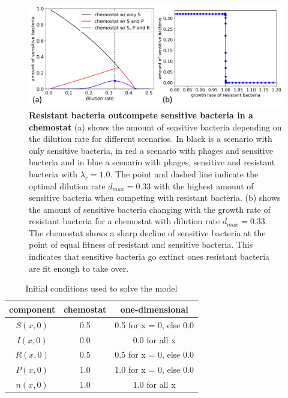 \begin{figure}
\centering
\includegraphics[width=\linewidth]{graphics/2025_09_30_phages_fig3.png}
\caption{\textbf{Resistant bacteria outcompete sensitive bacteria in a chemostat} (a) shows the amount of sensitive bacteria depending on the dilution rate for different scenarios. In black is a scenario with only sensitive bacteria, in red a scenario with phages and sensitive bacteria and in blue a scenario with phages, sensitive and resistant bacteria with $\lambda_r=1.0$. The point and dashed line indicate the optimal dilution rate $d_{max} = 0.33$ with the highest amount of sensitive bacteria when competing with resistant bacteria. (b) shows the amount of sensitive bacteria changing with the growth rate of resistant bacteria for a chemostat with dilution rate $d_{max} = 0.33$. The chemostat shows a sharp decline of sensitive bacteria at the point of equal fitness of resistant and sensitive bacteria. This indicates that sensitive bacteria go extinct ones resistant bacteria are fit enough to take over.}
\label{fig:results_chemostat_traveling_wave}
\end{figure}

\begin{table}
    \centering
    \begin{tabular}{c|c|c}
         component & chemostat & one-dimensional \\ \hline
         $S(x,0)$& 0.5 & 0.5 for x = 0, else 0.0 \\ 
         $I(x,0)$& 0.0 & 0.0 for all x\\ 
         $R(x,0)$& 0.5 & 0.5 for x = 0, else 0.0 \\
         $P(x,0)$& 1.0 & 1.0 for x = 0, else 0.0 \\
         $n(x,0)$& 1.0 & 1.0 for all x \\
    \end{tabular}
    \caption{Initial conditions used to solve the model}
    \label{tab:initial_conditions}
\end{table}

